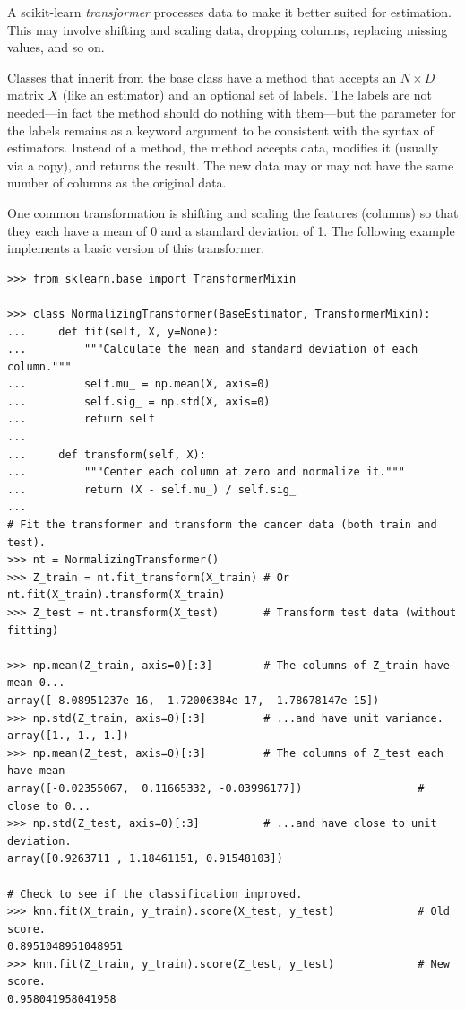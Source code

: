 A scikit-learn \emph{transformer} processes data to make it better suited for estimation.
This may involve shifting and scaling data, dropping columns, replacing missing values, and so on.

Classes that inherit from the  base class have a  method that accepts an $N\times D$ matrix $X$ (like an estimator) and an optional set of labels.
The labels are not needed---in fact the  method should do nothing with them---but the parameter for the labels remains as a keyword argument to be consistent with the  syntax of estimators.
Instead of a  method, the  method accepts data, modifies it (usually via a copy), and returns the result.
The new data may or may not have the same number of columns as the original data.

One common transformation is shifting and scaling the features (columns) so that they each have a mean of 0 and a standard deviation of 1.
The following example implements a basic version of this transformer.

\begin{lstlisting}
>>> from sklearn.base import TransformerMixin

>>> class NormalizingTransformer(BaseEstimator, TransformerMixin):
...     def fit(self, X, y=None):
...         """Calculate the mean and standard deviation of each column."""
...         self.mu_ = np.mean(X, axis=0)
...         self.sig_ = np.std(X, axis=0)
...         return self
...
...     def transform(self, X):
...         """Center each column at zero and normalize it."""
...         return (X - self.mu_) / self.sig_
...
# Fit the transformer and transform the cancer data (both train and test).
>>> nt = NormalizingTransformer()
>>> Z_train = nt.fit_transform(X_train) # Or nt.fit(X_train).transform(X_train)
>>> Z_test = nt.transform(X_test)       # Transform test data (without fitting)

>>> np.mean(Z_train, axis=0)[:3]        # The columns of Z_train have mean 0...
array([-8.08951237e-16, -1.72006384e-17,  1.78678147e-15])
>>> np.std(Z_train, axis=0)[:3]         # ...and have unit variance.
array([1., 1., 1.])
>>> np.mean(Z_test, axis=0)[:3]         # The columns of Z_test each have mean
array([-0.02355067,  0.11665332, -0.03996177])                  # close to 0...
>>> np.std(Z_test, axis=0)[:3]          # ...and have close to unit deviation.
array([0.9263711 , 1.18461151, 0.91548103])

# Check to see if the classification improved.
>>> knn.fit(X_train, y_train).score(X_test, y_test)             # Old score.
0.8951048951048951
>>> knn.fit(Z_train, y_train).score(Z_test, y_test)             # New score.
0.958041958041958
\end{lstlisting}

